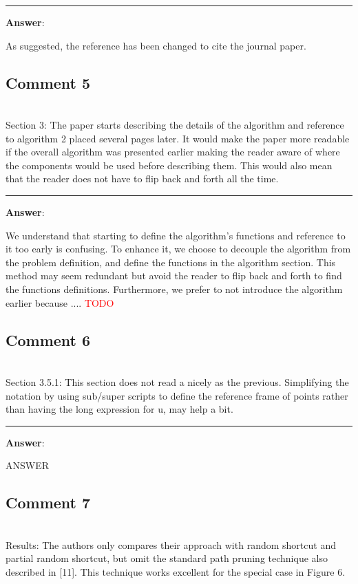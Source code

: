 \documentclass{scrartcl}
\newcommand{\todo}{\textcolor{red}{TODO}}
\begin{document}
\rule{\linewidth}{.1pt}
\textbf{Answer}:

As suggested, the reference has been changed to cite the journal paper.

\subsection{Comment 5}
\hrulefill\\

Section 3:
The paper starts describing the details of the algorithm and reference to algorithm 2 placed several pages later. It would make the paper more readable if the overall algorithm was presented earlier making the reader aware of where the components would be used before describing them. This would also mean that the reader does not have to flip back and forth all the time.

\rule{\linewidth}{.1pt}
\textbf{Answer}:

We understand that starting to define the algorithm's functions and reference to it too early is confusing. To enhance it, we choose to decouple the algorithm from the problem definition, and define the functions in the algorithm section. This method may seem redundant but avoid the reader to flip back and forth to find the functions definitions.
Furthermore, we prefer to not introduce the algorithm earlier because .... \todo

\subsection{Comment 6}
\hrulefill\\

Section 3.5.1:
This section does not read a nicely as the previous. Simplifying the notation by using sub/super scripts to define the reference frame of points rather than having the long expression for u, may help a bit.

\rule{\linewidth}{.1pt}
\textbf{Answer}:

ANSWER

\subsection{Comment 7}
\hrulefill\\

Results:
The authors only compares their approach with random shortcut and partial random shortcut, but omit the standard path pruning technique also described in [11]. This technique works excellent for the special case in Figure 6. 
\end{document}
